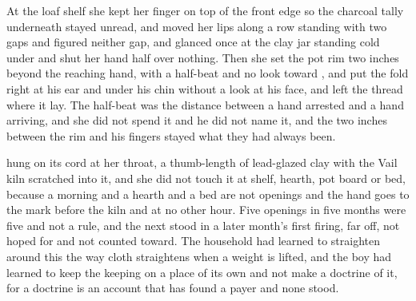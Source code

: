 At the loaf shelf she kept her finger on top of the front edge so the charcoal tally underneath stayed unread, and moved her lips along a row standing with two gaps and figured neither gap, and glanced once at the clay jar standing cold under  and shut her hand half over nothing. Then she set the pot rim two inches beyond the reaching hand, with a half-beat and no look toward , and put the fold right at his ear and under his chin without a look at his face, and left the thread where it lay. The half-beat was the distance between a hand arrested and a hand arriving, and she did not spend it and he did not name it, and the two inches between the rim and his fingers stayed what they had always been.

 hung on its cord at her throat, a thumb-length of lead-glazed clay with the Vail kiln scratched into it, and she did not touch it at shelf, hearth, pot board or bed, because a morning and a hearth and a bed are not openings and the hand goes to the mark before the kiln and at no other hour. Five openings in five months were five and not a rule, and the next stood in a later month's first firing, far off, not hoped for and not counted toward. The household had learned to straighten around this the way cloth straightens when a weight is lifted, and the boy had learned to keep the keeping on a place of its own and not make a doctrine of it, for a doctrine is an account that has found a payer and none stood.

\scenebreak

